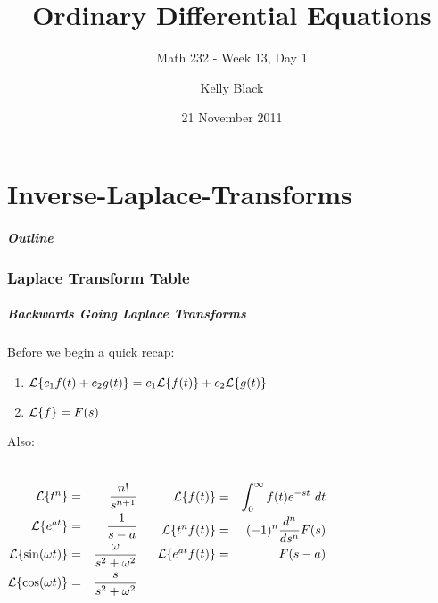 \part{Inverse-Laplace-Transforms}




\title{Ordinary Differential Equations}
\subtitle{Math 232 - Week 13, Day 1}

\author{Kelly Black}
\date{21 November 2011}

\begin{frame}
  \titlepage
\end{frame}

\begin{frame}
  \frametitle{Outline}
\end{frame}


\section{Laplace Transform Table}

\begin{frame}
  \frametitle{Backwards Going Laplace Transforms }

  Before we begin a quick recap:
  \begin{enumerate}
  \item $\laplace{c_1 f(t) + c_2 g(t)}=c_1 \laplace{f(t)} + c_2 \laplace{g(t)}$
  \item $\laplace{f}=F(s)$
  \end{enumerate}

  Also:
  \begin{columns}
    \begin{eqnarray*}
      \laplace{t^n}    & = & \frac{n!}{s^{n+1}} \\ 
      \laplace{e^{at}} & = & \frac{1}{s-a} \\ 
      \laplace{\sin(\omega t)} & = & \frac{\omega}{s^2+\omega^2} \\
      \laplace{\cos(\omega t)} & = & \frac{s}{s^2+\omega^2} \\ 
    \end{eqnarray*}

    \begin{eqnarray*}
      \laplace{f(t)}  & = & \int^\infty_0 f(t) e^{-st} ~ dt \\ 
      \laplace{t^nf(t)} & = & (-1)^n\frac{d^n}{ds^n}F(s) \\
      \laplace{e^{at}f(t)} & = & F(s-a) 
    \end{eqnarray*}

  \end{columns}


\end{frame}


